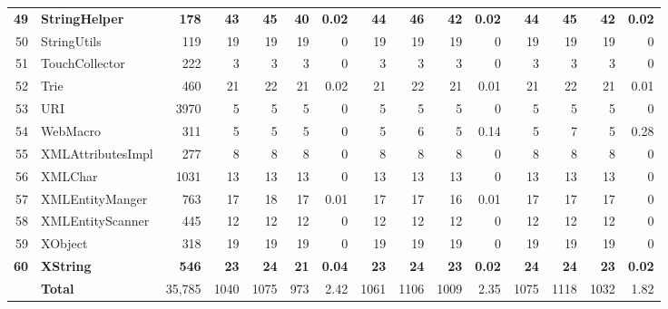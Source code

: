 \documentclass[conference]{IEEEtran}
\begin{document}
\begin{table} [htp!]
{\begin{tabularx}{0.91 \textwidth}{|r|l|r|r|r|r|r|r|r|r|r|r|r|r|r|}
\textbf{49}						& \textbf{StringHelper}				&\textbf{178}		& \textbf{43}	 	& 	\textbf{45}	&	\textbf{40}	& 	\textbf{0.02}					& \textbf{44}		&  \textbf{46}		& \textbf{42}		& 		\textbf{0.02}			& \textbf{44}			& \textbf{45}			& \textbf{42}			&	\textbf{0.02}\\      
50						& StringUtils				&119		& 19 		&	19	&	19	& 	0					& 19		& 19 		& 19		& 		0			& 19			& 19			& 19			&	0\\      
51						& TouchCollector			&222		& 3		&	3	&	3	& 	0					& 3		&  3		& 3		& 		0			& 3			& 3			& 3			&	0\\      
52						& Trie					&460		& 21		&	22	&	21	& 	0.02					& 21		&  22		& 21		& 		0.01			& 21			& 22			& 21			&	0.01\\      
53						& URI					&3970		& 5 		&	5	&	5	& 	0					& 5		&  5		& 5		& 		0			& 5			& 5			& 5			&	0\\      
54						& WebMacro				&311		& 5		&	5	&	5	& 	0					& 5		&  6		& 5		& 		0.14			& 5			& 7			& 5			&	0.28\\      
55						& XMLAttributesImpl			&277		& 8		&	8	&	8	& 	0					& 8		&  8		& 8		& 		0			& 8			& 8			& 8			&	0\\      
56						& XMLChar				&1031		& 13		&	13	&	13	& 	0					& 13		&  13		& 13		& 		0			& 13			& 13			& 13			&	0\\      
57						& XMLEntityManger			&763		& 17		&	18	&	17	& 	0.01					& 17		&  17		& 16		& 		0.01			& 17			& 17			& 17			&	0\\      
58						& XMLEntityScanner			&445		& 12		&	12	&	12	& 	0					& 12		&  12		& 12		& 		0			& 12			& 12			& 12			&	0\\      
59						& XObject					&318		& 19		&	19	&	19	& 	0					& 19		&  19		& 19		& 		0			& 19			& 19			& 19			&	0\\      
\textbf{60}						& \textbf{XString}					&\textbf{546}		& \textbf{23}		&	\textbf{24}	&	\textbf{21}	& 	\textbf{0.04}					& \textbf{23}		&  \textbf{24}		& \textbf{23}		& 		\textbf{0.02}			& \textbf{24}			& \textbf{24}			& \textbf{23}			&	\textbf{0.02}\\      
\hline 
    				&{\textbf{Total}}	&35,785	&1040	&	1075	&    973	&	2.42				& 1061	&1106	&1009	&		2.35		& 1075		& 1118		& 1032		& 	1.82\\
   \hline
     \end{tabularx} }
    \bigskip
    \label{table:Results}
\end{table}
\end{document}
